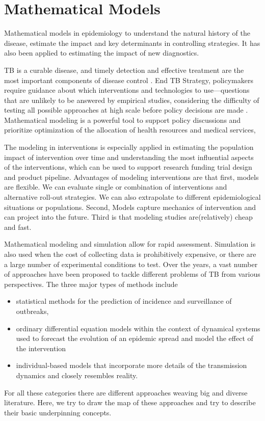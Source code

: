 \documentclass[8pt,twocolumn]{extarticle}
\begin{document}
\section{Mathematical Models}
Mathematical models in epidemiology to understand the natural history of the disease, estimate the impact and key determinants in controlling strategies. It has also been applied to estimating the impact of new diagnostics. 

TB is a curable disease, and timely detection and effective treatment are the most important components of disease control \cite{WHO2016}. End TB Strategy, policymakers require guidance about which interventions and technologies to use—questions that are unlikely to be answered by empirical studies, considering the difficulty of testing all possible approaches at high scale before policy decisions are made \cite{WHO2016}. Mathematical modeling is a powerful tool to support policy discussions and prioritize optimization of the allocation of health resources and medical services,

The modeling in interventions is especially applied in estimating the population impact of intervention over time and understanding the most influential aspects of the interventions, which can be used to support research funding trial design and product pipeline. Advantages of modeling interventions are that first, models are flexible. We can evaluate single or combination of interventions and alternative roll-out strategies. We can also extrapolate to different epidemiological situations or populations. Second, Models capture mechanics of intervention and can project into the future. Third is that modeling studies are(relatively) cheap and fast.

Mathematical modeling and simulation allow for rapid assessment. Simulation is also used when the cost of collecting data is prohibitively expensive, or there are a large number of experimental conditions to test. Over the years, a vast number of approaches have been proposed to tackle different problems of TB from various perspectives. The three major types of methods include 
\begin{itemize}
    \item statistical methods for the prediction of incidence and surveillance of outbreaks,
    \item ordinary differential equation  models within the context of dynamical systems used to forecast the evolution of an epidemic spread and model the effect of the intervention
    \item individual-based models that incorporate more details of the transmission dynamics and closely resembles reality.
\end{itemize}
For all these categories there are different approaches weaving big and diverse literature. Here, we try to draw the map of these approaches and try to describe their basic underpinning concepts. 
 
\end{document}
